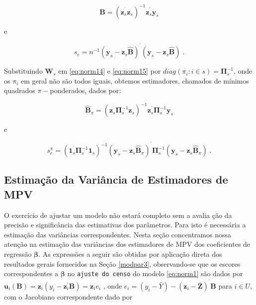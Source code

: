 \documentclass[]{book}
\numberwithin{example}{chapter}
\numberwithin{remark}{chapter}
\numberwithin{definition}{chapter}
\begin{document}
\begin{equation}
\widehat{\mathbf{B}}=\left( \mathbf{z}_{s}^{^{\prime }}\mathbf{z}_{s}\right)
^{-1}\mathbf{z}_{s}^{^{\prime }}\mathbf{y}_{s}  \label{eq:norm16}
\end{equation}

e

\begin{equation}
s_{e}=n^{-1}\left( \mathbf{y}_{s}-\mathbf{z}_{s}\widehat{\mathbf{B}}\right)
^{^{\prime }}\left( \mathbf{y}_{s}-\mathbf{z}_{s}\widehat{\mathbf{B}}\right)
\;.  \label{eq:norm17}
\end{equation}

Substituindo \(\mathbf{W}_{s}\) em \eqref{eq:norm14} e \eqref{eq:norm15} por
\(diag\left( \pi _{i}:i\in s\right) =\mathbf{\Pi }_{s}^{-1}\), onde os
\(\pi _{i}\) em geral não são todos iguais, obtemos estimadores,
chamados de mínimos quadrados \(\pi -\)ponderados, dados por:

\begin{equation}
\widehat{\mathbf{B}}_{\pi }=\left( \mathbf{z}_{s}^{^{\prime }}\mathbf{\Pi }
_{s}^{-1}\mathbf{z}_{s}\right) ^{-1}\mathbf{z}_{s}^{^{\prime }}\mathbf{\Pi }
_{s}^{-1}\mathbf{y}_{s}  \label{eq:norm18}
\end{equation}

e

\begin{equation}
s_{e}^{\pi }=\left( \mathbf{1}_{s}^{^{\prime }}\mathbf{\Pi }_{s}^{-1}\mathbf{
1}_{s}\right) ^{-1}\left( \mathbf{y}_{s}-\mathbf{z}_{s}\widehat{\mathbf{B}}
_{\pi }\right) ^{^{\prime }}\mathbf{\Pi }_{s}^{-1}\left( \mathbf{y}_{s}-
\mathbf{z}_{s}\widehat{\mathbf{B}}_{\pi }\right) \;.  \label{eq:norm19}
\end{equation}

\subsection{Estimação da Variância de Estimadores de
MPV}\label{estimacao-da-variancia-de-estimadores-de-mpv}

O exercício de ajustar um modelo não estará completo sem a avalia ção da
precisão e significância das estimativas dos parâmetros. Para isto é
necessária a estimação das variâncias correspondentes. Nesta seção
concentramos nossa atenção na estimação das variâncias dos estimadores
de MPV dos coeficientes de regressão \(\mathbf{\beta}\). As expressões a
seguir são obtidas por aplicação direta dos resultados gerais fornecidos
na Seção \ref{modpar3}, observando-se que os escores correspondentes a
\(\mathbf{\beta}\) no \texttt{ajuste\ do\ censo} do modelo
\eqref{eq:norm1} são dados por
\(\mathbf{u}_{i}\left( \mathbf{B}\right) =\mathbf{z}_{i}\left( y_{i}-\mathbf{z}_{i}^{\prime }\mathbf{B}\right) =\mathbf{z} _{i}e_{i}\)
, onde
\(e_{i}=\left( y_{i}-\bar{Y}\right) -\left( \mathbf{z}_{i}-\mathbf{\bar{Z}}\right) ^{^{\prime }}\mathbf{B}\)
para \(i\in U\), com o Jacobiano correspondente dado por
\end{document}
